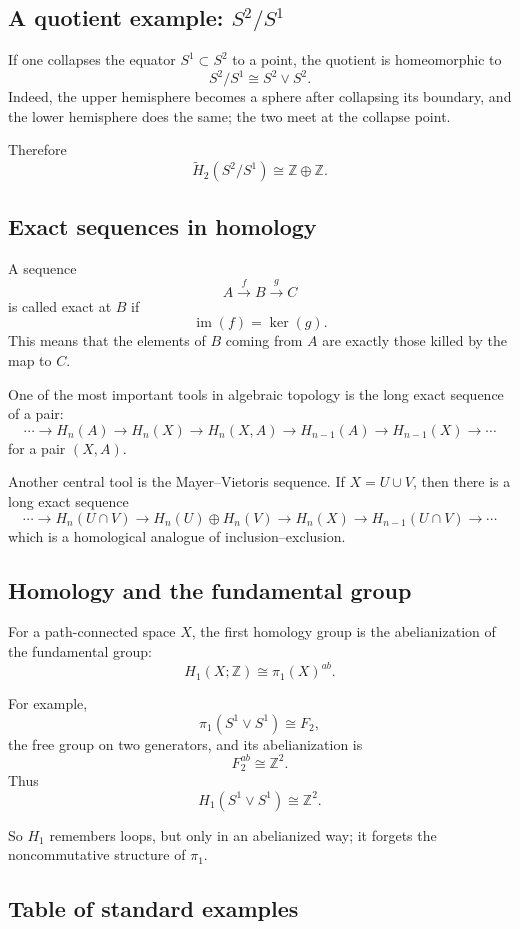 \documentclass[12pt,a4paper]{article}
\theoremstyle{notespace}
\begin{document}
\subsection{A quotient example: \(S^2/S^1\)}

If one collapses the equator \(S^1\subset S^2\) to a point, the quotient is homeomorphic to
\[
S^2/S^1 \cong S^2\vee S^2.
\]
Indeed, the upper hemisphere becomes a sphere after collapsing its boundary, and the lower hemisphere does the same; the two meet at the collapse point.

Therefore
\[
\widetilde{H}_2(S^2/S^1)\cong \mathbb{Z}\oplus \mathbb{Z}.
\]

\subsection{Exact sequences in homology}

A sequence
\[
A\xrightarrow{f} B\xrightarrow{g} C
\]
is called exact at \(B\) if
\[
\operatorname{im}(f)=\ker(g).
\]
This means that the elements of \(B\) coming from \(A\) are exactly those killed by the map to \(C\).

One of the most important tools in algebraic topology is the long exact sequence of a pair:
\[
\cdots \to H_n(A)\to H_n(X)\to H_n(X,A)\to H_{n-1}(A)\to H_{n-1}(X)\to \cdots
\]
for a pair \((X,A)\).

Another central tool is the Mayer--Vietoris sequence. If \(X=U\cup V\), then there is a long exact sequence
\[
\cdots \to H_n(U\cap V)\to H_n(U)\oplus H_n(V)\to H_n(X)\to H_{n-1}(U\cap V)\to \cdots
\]
which is a homological analogue of inclusion--exclusion.

\subsection{Homology and the fundamental group}

For a path-connected space \(X\), the first homology group is the abelianization of the fundamental group:
\[
H_1(X;\mathbb{Z})\cong \pi_1(X)^{ab}.
\]

For example,
\[
\pi_1(S^1\vee S^1)\cong F_2,
\]
the free group on two generators, and its abelianization is
\[
F_2^{ab}\cong \mathbb{Z}^2.
\]
Thus
\[
H_1(S^1\vee S^1)\cong \mathbb{Z}^2.
\]

So \(H_1\) remembers loops, but only in an abelianized way; it forgets the noncommutative structure of \(\pi_1\).

\subsection{Table of standard examples}
\end{document}
